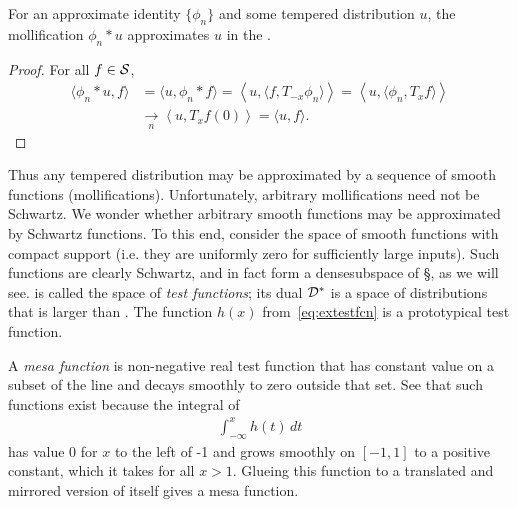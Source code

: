     \begin{lemma}
      \label{lemma:mollwithid}
      For an approximate identity $\{\phi_n\}$ and some tempered distribution $u$, the mollification $\phi_n*u$ approximates $u$ in the \ws.
    \end{lemma}
    \begin{proof}
      For all $f\in\S$, 
      \begin{align*}
        \langle \phi_n*u, f\rangle
        &= \langle u, \phi_n*f\rangle
        = \left\langle u, \langle f, T_{-x}\phi_n\rangle \right\rangle
        = \left\langle u, \langle \phi_n, T_{x}f\rangle \right\rangle
        \\&\underset{n}{\longrightarrow} \left\langle u, T_xf(0) \right\rangle
        = \langle u,f\rangle \text{.}
      \end{align*}
    \end{proof}

    Thus any tempered distribution may be approximated by a sequence of smooth functions (mollifications).
    Unfortunately, arbitrary mollifications need not be Schwartz.
    We wonder whether arbitrary smooth functions may be approximated by Schwartz functions.
    To this end, consider the space \D of smooth functions with compact support (i.e. they are uniformly zero for sufficiently large inputs).
    Such functions are clearly Schwartz, and in fact form a dense\footnotemark subspace of \S, as we will see.
    \D is called the space of \emph{test functions}; its dual $\D^*$ is a space of distributions that is larger than \SS.
    The function $h(x)$ from~\cref{eq:extestfcn} is a prototypical test function.
    
    A \emph{mesa function} is non-negative real test function that has constant value on a subset of the line and decays smoothly to zero outside that set.
    See that such functions exist because the integral of
    \begin{align*}
      \int_{-\infty}^x h(t)\,dt
    \end{align*}
    has value 0 for $x$ to the left of -1 and grows smoothly on $[-1,1]$ to a positive constant, which it takes for all $x>1$.
    Glueing this function to a translated and mirrored version of itself gives a mesa function.

